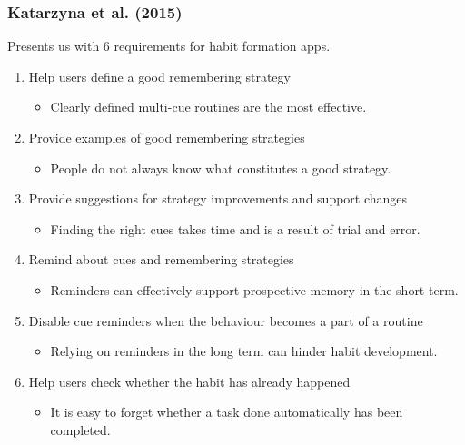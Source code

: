\subsubsection*{Katarzyna et al. (2015)}

  Presents us with 6 requirements for habit formation apps.

  \begin{enumerate}

    \item Help users define a good remembering strategy
      \begin{itemize}
        \item Clearly defined multi-cue routines are the most effective.
      \end{itemize}

    \item Provide examples of good remembering strategies
      \begin{itemize}
        \item People do not always know what constitutes a good strategy.
      \end{itemize}

    \item Provide suggestions for strategy improvements and support changes
      \begin{itemize}
        \item Finding the right cues takes time and is a result of trial and error.
      \end{itemize}

    \item Remind about cues and remembering strategies
      \begin{itemize}
        \item Reminders can effectively support prospective memory in the short term.
      \end{itemize}

    \item Disable cue reminders when the behaviour becomes a part of a routine
      \begin{itemize}
        \item Relying on reminders in the long term can hinder habit development.
      \end{itemize}

    \item Help users check whether the habit has already happened
      \begin{itemize}
        \item It is easy to forget whether a task done automatically has been completed.
    \end{itemize}

  \end{enumerate}

